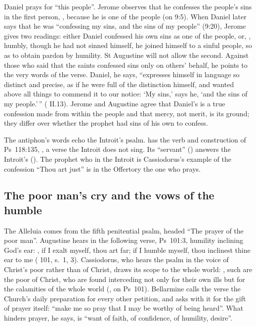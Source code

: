 Daniel prays for ``this people''. Jerome observes that he confesses the
people's sins in the first person, , because he
is one of the people (on 9:5). When Daniel later says that he was ``confessing
my sins, and the sins of my people'' (9:20), Jerome gives two readings: either
Daniel confessed his own sins as one of the people, or, , humbly, though he had not sinned himself, he joined himself to a
sinful people, so as to obtain pardon by humility. St Augustine will not allow
the second. Against those who said that the saints confessed sins only on
others' behalf, he points to the very words of the verse. Daniel, he says,
``expresses himself in language so distinct and precise, as if he were full of
the distinction himself, and wanted above all things to commend it to our
notice: `My sins,' says he, `and the sins of my people.'\,''
( II.13). Jerome and Augustine agree
that Daniel's is a true confession made from within the people and that mercy,
not merit, is its ground; they differ over whether the prophet had sins of his
own to confess.

The antiphon's words echo the Introit's psalm.  has the verb and construction of Ps~118:135,
, a verse the Introit does not
sing. Its ``servant'' () answers the Introit's
(). The prophet who in the Introit is Cassiodorus's
example of the confession ``Thou art just'' is in the Offertory the one who
prays.

\subsection{The poor man's cry and the vows of the humble}

The Alleluia comes from the fifth penitential psalm, headed ``The prayer of
the poor man''. Augustine hears in the following verse, Ps~101:3, humility inclining God's
ear: , if I exalt myself, thou art far; if I humble myself, thou inclinest thine
ear to me ( 101, s.~1, 3). Cassiodorus, who
hears the psalm in the voice of Christ's poor rather than of Christ, draws its
scope to the whole world: , such are the poor of Christ, who are found interceding not only
for their own ills but for the calamities of the whole world
(, on Ps~101). Bellarmine calls the verse the
Church's daily preparation for every other petition, and asks with it for the
gift of prayer itself: ``make me so pray that I may be worthy of being
heard''. What hinders prayer, he says, is ``want of faith, of confidence, of
humility, desire''.

